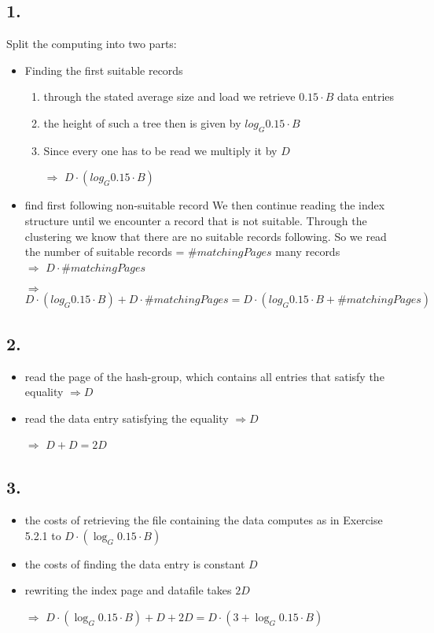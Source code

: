 \documentclass[12pt]{article}
\begin{document}
	\subsection*{1.}
		Split the computing into two parts:
		\begin{itemize}
			\item Finding the first suitable records\\
				\begin{enumerate}
					\item through the stated average size and load we retrieve $0.15\cdot B$ data entries
					\item the height of such a tree then is given by $log_G 0.15\cdot B$
					\item Since every one has to be read we multiply it by $D$
					\item[$\Rightarrow$] $D\cdot(log_G 0.15\cdot B)$
				\end{enumerate}				
			\item find first following non-suitable record 
				We then continue reading the index structure until we encounter a record that is not suitable. Through the clustering we know that there are no suitable records following. So we read the number of suitable records = $\# matchingPages$ many records\\
				$\Rightarrow$ $D\cdot \# matchingPages$
			\item[$\Rightarrow$] $D\cdot(log_G 0.15\cdot B) + D\cdot \# matchingPages = D\cdot(log_G 0.15\cdot B + \# matchingPages)$
		\end{itemize}
	\subsection*{2.}
		\begin{itemize}
			\item read the page of the hash-group, which contains all entries that satisfy the equality $\Rightarrow D$
			\item read the data entry satisfying the equality $\Rightarrow D$
			\item[$\Rightarrow$] $D+D=2D$
		\end{itemize}
	\subsection*{3.}
		\begin{itemize}
			\item the costs of retrieving the file containing the data computes as in Exercise 5.2.1 to $D\cdot (\log_G 0.15\cdot B)$
			\item the costs of finding the data entry is constant $D$
			\item rewriting the index page and datafile takes $2D$
			\item[$\Rightarrow$] $D\cdot (\log_G 0.15\cdot B) + D + 2D = D\cdot (3+\log_G 0.15\cdot B)$
		\end{itemize}
	
\end{document}

